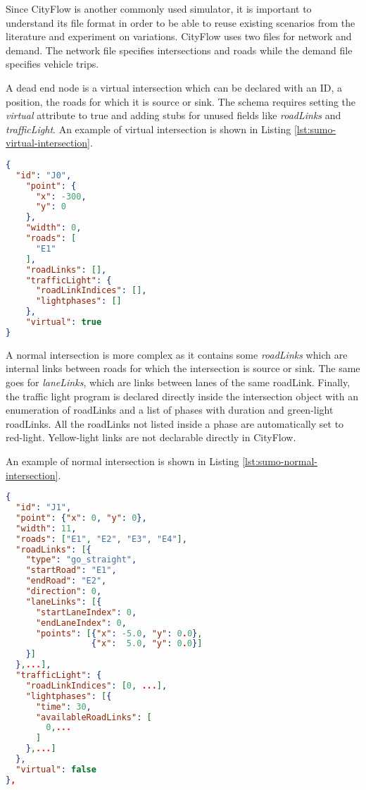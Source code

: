 Since CityFlow is another commonly used simulator, it is important to understand its file format in order to be able to reuse existing scenarios from the literature and experiment on variations.
CityFlow uses two files for network and demand.
The network file specifies intersections and roads while the demand file specifies vehicle trips.

A dead end node is a virtual intersection which can be declared with an ID, a position, the roads for which it is source or sink.
The schema requires setting the \textit{virtual} attribute to true and adding stubs for unused fields like \textit{roadLinks} and \textit{trafficLight}.
An example of virtual intersection is shown in Listing \ref{lst:sumo-virtual-intersection}.

\noindent
\begin{minipage}{\linewidth}
\begin{lstlisting}[language=JSON, caption=Example of virtual intersection declaration in CityFlow format, label={lst:cityflow-virtual-intersection}]
{
  "id": "J0",
    "point": {
      "x": -300,
      "y": 0
    },
    "width": 0,
    "roads": [
      "E1"
    ],
    "roadLinks": [],
    "trafficLight": {
      "roadLinkIndices": [],
      "lightphases": []
    },
    "virtual": true
}
\end{lstlisting}
\end{minipage}

A normal intersection is more complex as it contains some \textit{roadLinks} which are internal links between roads for which the intersection is source or sink.
The same goes for \textit{laneLinks}, which are links between lanes of the same roadLink.
Finally, the traffic light program is declared directly inside the intersection object with an enumeration of roadLinks and a list of phases with duration and green-light roadLinks.
All the roadLinks not listed inside a phase are automatically set to red-light.
Yellow-light links are not declarable directly in CityFlow.

An example of normal intersection is shown in Listing \ref{lst:sumo-normal-intersection}.

\noindent
\begin{minipage}{\linewidth}
\begin{lstlisting}[language=JSON, caption=Example of normal intersection declaration in CityFlow format, label={lst:cityflow-normal-intersection}]
{
  "id": "J1",
  "point": {"x": 0, "y": 0},
  "width": 11,
  "roads": ["E1", "E2", "E3", "E4"],
  "roadLinks": [{
    "type": "go_straight",
    "startRoad": "E1",
    "endRoad": "E2",
    "direction": 0,
    "laneLinks": [{
      "startLaneIndex": 0,
      "endLaneIndex": 0,
      "points": [{"x": -5.0, "y": 0.0},
                 {"x":  5.0, "y": 0.0}]
    }]
  },...],
  "trafficLight": {
    "roadLinkIndices": [0, ...],
    "lightphases": [{
      "time": 30,
      "availableRoadLinks": [
        0,...
      ]
    },...]
  },
  "virtual": false
},
\end{lstlisting}
\end{minipage}

